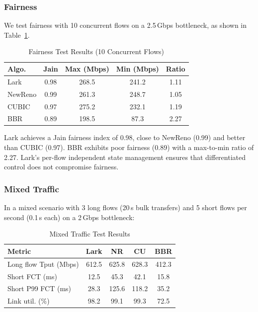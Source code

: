 \documentclass[10pt,twocolumn]{article}
\begin{document}
\subsubsection{Fairness}

We test fairness with 10 concurrent flows on a 2.5\,Gbps bottleneck, as shown in Table~\ref{tab:fairness}.

\begin{table}[htbp]
\centering
\caption{Fairness Test Results (10 Concurrent Flows)}
\label{tab:fairness}
\small
\begin{tabular}{lcccc}
\toprule
\textbf{Algo.} & \textbf{Jain} & \textbf{Max (Mbps)} & \textbf{Min (Mbps)} & \textbf{Ratio} \\
\midrule
Lark & 0.98 & 268.5 & 241.2 & 1.11 \\
NewReno & 0.99 & 261.3 & 248.7 & 1.05 \\
CUBIC & 0.97 & 275.2 & 232.1 & 1.19 \\
BBR & 0.89 & 198.5 & 87.3 & 2.27 \\
\bottomrule
\end{tabular}
\end{table}

Lark achieves a Jain fairness index of 0.98, close to NewReno (0.99) and better than CUBIC (0.97). BBR exhibits poor fairness (0.89) with a max-to-min ratio of 2.27. Lark's per-flow independent state management ensures that differentiated control does not compromise fairness.

\subsubsection{Mixed Traffic}

In a mixed scenario with 3 long flows (20\,s bulk transfers) and 5 short flows per second (0.1\,s each) on a 2\,Gbps bottleneck:

\begin{table}[htbp]
\centering
\caption{Mixed Traffic Test Results}
\label{tab:mixed}
\small
\begin{tabular}{lcccc}
\toprule
\textbf{Metric} & \textbf{Lark} & \textbf{NR} & \textbf{CU} & \textbf{BBR} \\
\midrule
Long flow Tput (Mbps) & 612.5 & 625.8 & 628.3 & 412.3 \\
Short FCT (ms) & 12.5 & 45.3 & 42.1 & 15.8 \\
Short P99 FCT (ms) & 28.3 & 125.6 & 118.2 & 35.2 \\
Link util. (\%) & 98.2 & 99.1 & 99.3 & 72.5 \\
\bottomrule
\end{tabular}
\end{table}
\end{document}
